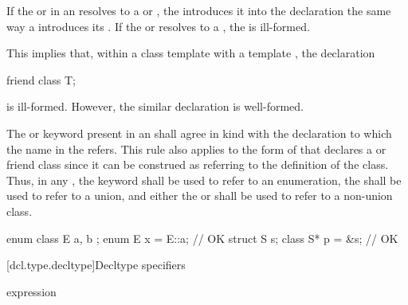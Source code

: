 \pnum
If the  or 
in an 
resolves to a  or
, the 
introduces it into the declaration the same way a
 introduces
its .
If the  or  resolves to a
,
the  is ill-formed.
\begin{note}
This implies that, within a class template with a template
 , the declaration
\begin{codeblock}
friend class T;
\end{codeblock}
is ill-formed. However, the similar declaration  is well-formed.
\end{note}

\pnum
The  or  keyword
present in an
 shall agree in kind with the
declaration to which the name in the
 refers. This rule also applies to
the form of  that declares a
 or friend class since it can be construed
as referring to the definition of the class. Thus, in any
, the  keyword
shall be
used to refer to an enumeration, the 
 shall be used to refer to a union,
and either the  or 
 shall be used to refer to a non-union class.
\begin{example}
\begin{codeblock}
enum class E { a, b };
enum E x = E::a;                // OK
struct S { } s;
class S* p = &s;                // OK
\end{codeblock}
\end{example}

[dcl.type.decltype]{Decltype specifiers}%
%

\begin{bnf}
\br
   \terminal{(} expression \terminal{)}
\end{bnf}

